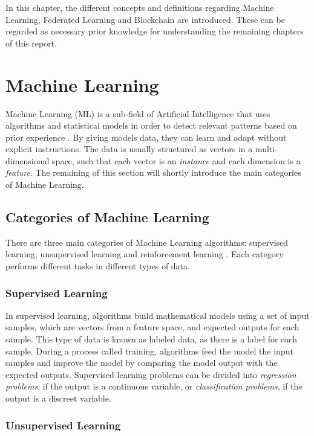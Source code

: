 In this chapter, the different concepts and definitions regarding Machine Learning, Federated Learning and Blockchain are introduced. These can be regarded as necessary prior knowledge for understanding the remaining chapters of this report.

\section{Machine Learning}

Machine Learning (ML) is a sub-field of Artificial Intelligence that uses algorithms and statistical models in order to detect relevant patterns based on prior experience \cite{geron_2019}. By giving models data, they can learn and adapt without explicit instructions. The data is usually structured as vectors in a multi-dimensional space, such that each vector is an \textit{instance} and each dimension is a \textit{feature}. The remaining of this section will shortly introduce the main categories of Machine Learning.

\subsection{Categories of Machine Learning}

There are three main categories of Machine Learning algorithms: supervised learning, unsupervised learning and reinforcement learning \cite{geron_2019}. Each category performs different tasks in different types of data.

\subsubsection{Supervised Learning}

In supervised learning, algorithms build mathematical models using a set of input samples, which are vectors from a feature space, and expected outputs for each sample. This type of data is known as labeled data, as there is a label for each sample. During a process called training, algorithms feed the model the input samples and improve the model by comparing the model output with the expected outputs. Supervised learning problems can be divided into \textit{regression problems}, if the output is a continuous variable, or \textit{classification problems}, if the output is a discreet variable.

\subsubsection{Unsupervised Learning}

